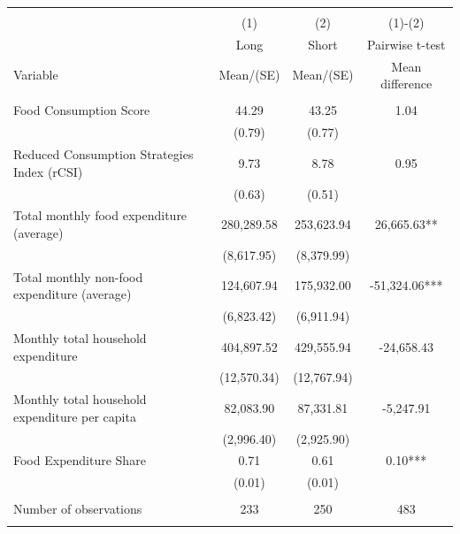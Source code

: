 
\begin{tabular}{@{\extracolsep{5pt}}lccc}
\\[-1.8ex]\hline \hline \\[-1.8ex]
 & \multicolumn{1}{c}{(1)}  & \multicolumn{1}{c}{(2)}  & \multicolumn{1}{c}{(1)-(2)} \\
 & \multicolumn{1}{c}{Long}  & \multicolumn{1}{c}{Short}  & \multicolumn{1}{c}{Pairwise t-test}  \\
Variable & Mean/(SE) & Mean/(SE) & Mean difference \\ \hline \\[-1.8ex] 
Food Consumption Score   & 44.29    & 43.25    & 1.04   \\
 & (0.79)  & (0.77)  &  \\ [1ex]
Reduced Consumption Strategies Index (rCSI)   & 9.73    & 8.78    & 0.95   \\
 & (0.63)  & (0.51)  &  \\ [1ex]
Total monthly food expenditure (average)   & 280,289.58    & 253,623.94    & 26,665.63**   \\
 & (8,617.95)  & (8,379.99)  &  \\ [1ex]
Total monthly non-food expenditure (average)   & 124,607.94    & 175,932.00    & -51,324.06***   \\
 & (6,823.42)  & (6,911.94)  &  \\ [1ex]
Monthly total household expenditure   & 404,897.52    & 429,555.94    & -24,658.43   \\
 & (12,570.34)  & (12,767.94)  &  \\ [1ex]
Monthly total household expenditure per capita   & 82,083.90    & 87,331.81    & -5,247.91   \\
 & (2,996.40)  & (2,925.90)  &  \\ [1ex]
Food Expenditure Share   & 0.71    & 0.61    & 0.10***   \\
 & (0.01)  & (0.01)  &  \\ [1ex]
\hline \\[-1.8ex]
Number of observations  & 233   & 250  & 483  \\
\hline \hline \\[-1.8ex]

\end{tabular}
